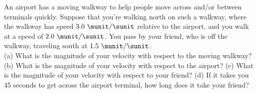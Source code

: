 An airport has a moving walkway to help people move across and/or
between terminals quickly. Suppose that you're walking north on such
a walkway, where the walkway has speed $3.0\ \munit/\sunit$ relative
to the airport, and you walk at a speed of $2.0\ \munit/\sunit$. You
pass by your friend, who is off the walkway, traveling 
south at $1.5\ \munit/\sunit$.\\
%
(a) What is the magnitude of your velocity with respect to the moving
walkway?\answercheck\hwendpart
%
(b) What is the magnitude of your velocity with respect to the
airport?\answercheck\hwendpart
%
(c) What is the magnitude of your velocity with respect to your
friend?\answercheck\hwendpart
%
(d) If it takes you 45 seconds to get across the airport terminal, how
long does it take your friend?\answercheck
